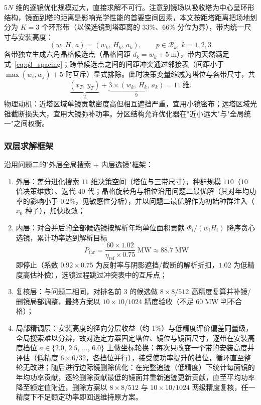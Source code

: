 \documentclass[12pt,a4paper,fontset=fandol]{ctexart}
\begin{document}
$5N$ 维的逐镜优化规模过大，直接求解不可行。注意到镜场以吸收塔为中心呈环形结构，镜面到塔的距离是影响光学性能的首要空间因素，本文按距塔距离把场地划分为 $K=3$ 个环形带（以候选镜到塔距离的 $33\%$、$66\%$ 分位为界），带内统一尺寸与安装高度：
\begin{equation}
    (w,\,H,\,a) = (w_k,\,H_k,\,a_k),\qquad p \in \mathcal{R}_k,\ k = 1,2,3
    \label{eq:q3_bands}
\end{equation}
各带独立生成六角晶格候选点（晶格间距 $d_k = w_k + 5\;\mathrm{m}$），带内天然满足式~\eqref{eq:q3_spacing}；跨带候选点之间的间距冲突通过邻接表（间距小于 $\max(w_i,w_j)+5$ 时互斥）显式排除。此时决策变量缩减为塔位与各带尺寸，共
\begin{equation}
    \underbrace{(x_T,\,y_T)}_{2} + \underbrace{3 \times (w_k,\,H_k,\,a_k)}_{9} = 11\;\text{维}.
    \label{eq:q3_dim}
\end{equation}
物理动机：近塔区域单镜贡献密度高但相互遮挡严重，宜用小镜密布；远塔区域光锥截断损失大，宜用大镜弥补功率。分区结构允许优化器在"近小远大"与"全局统一"之间权衡。

\subsubsection{双层求解框架}

沿用问题二的"外层全局搜索 + 内层选镜"框架：
\begin{enumerate}
    \item 外层：差分进化搜索 $11$ 维决策空间（塔位与三带尺寸），种群规模 $110$（$10$ 倍决策维数）、迭代 $40$ 代；晶格旋转角与相位沿用问题二最优解（其对年均功率的影响小于 $0.2\%$，见敏感性分析），并以问题二最优解作为初始种群注入（$x_0$ 种子），加快收敛；
    \item 内层：对合并后的全部候选镜按解析年均单位面积贡献 $\Phi_i / (w_i H_i)$ 降序贪心选镜，累计功率达到解析目标
    \begin{equation}
        P_{\mathrm{tar}} = \frac{60 \times 1.02}{\eta_{\mathrm{ref}} \times 0.75}\;\mathrm{MW} \approx 88.7\;\mathrm{MW}
        \label{eq:q3_target}
    \end{equation}
    即停止（系数 $0.92 \times 0.75$ 为反射率与阴影遮挡/截断的解析折扣，$1.02$ 为低精度高估补偿），选镜过程跳过冲突表中的互斥点；
    \item 复核层：与问题二相同，对排名前 $3$ 的候选做 $8\times8/512$ 高精度复算并补镜/删镜局部调整，最终方案以 $10\times10/1024$ 精度验收（不足 $60\;\mathrm{MW}$ 判不合格）；
    \item 局部精调层：安装高度的径向分层收益（约 $1\%$）与低精度评价偏差同量级，全局搜索难以分辨，故对选定方案固定塔位、镜位与镜面尺寸，逐带在安装高度档位 $a \in \{2.0,\, 2.5,\, \dots,\, 6.0\}$ 上做坐标轮换：每次只改变一个带的安装高度并评估（低精度 $6\times6/32$，各档位并行），接受使功率提升的档位，循环直至整轮无改进；随后进行边际镜删除优化：在完整追迹（低精度）下统计每面镜的年均功率贡献，逐轮删除贡献最低的镜面并重新追迹更新贡献，直至平均功率降至额定值附近，删除方案以 $8\times8/512$ 与 $10\times10/1024$ 两级精度复核，任一精度下不足额定功率即回退维持原方案。
\end{enumerate}
\end{document}
